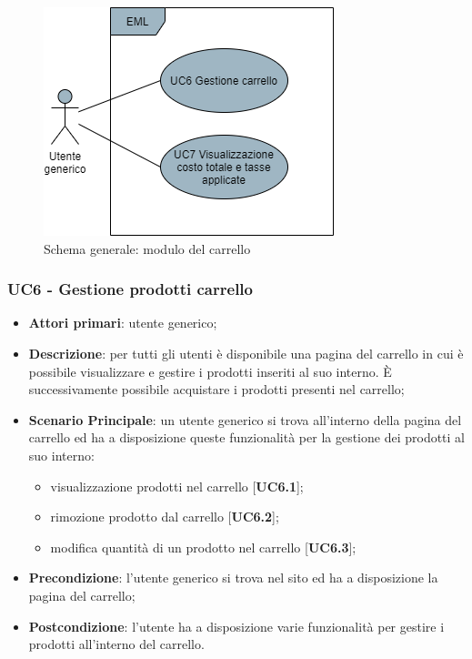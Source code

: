 \begin{figure}[H]
\centering
\includegraphics[scale=0.6]{res/UseCase/Immagini/CarrelloGenerale}
\caption{Schema generale: modulo del carrello}
\end{figure}

\subsubsection{UC6 - Gestione prodotti carrello}
\begin{itemize}
\item \textbf{Attori primari}: utente generico;
\item \textbf{Descrizione}: per tutti gli utenti è disponibile una pagina del carrello in cui è possibile visualizzare e gestire i prodotti inseriti al suo interno. È successivamente possibile acquistare i prodotti presenti nel carrello;
\item \textbf{Scenario Principale}: un utente generico si trova all'interno della pagina del carrello ed ha a disposizione queste funzionalità per la gestione dei prodotti al suo interno:
\begin{itemize}
\item visualizzazione prodotti nel carrello [\textbf{UC6.1}];
\item rimozione prodotto dal carrello [\textbf{UC6.2}];
\item modifica quantità di un prodotto nel carrello [\textbf{UC6.3}];
\end{itemize}
\item \textbf{Precondizione}: l'utente generico si trova nel sito ed ha a disposizione la pagina del carrello;
\item \textbf{Postcondizione}: l'utente ha a disposizione varie funzionalità per gestire i prodotti all'interno del carrello.
\end{itemize}

